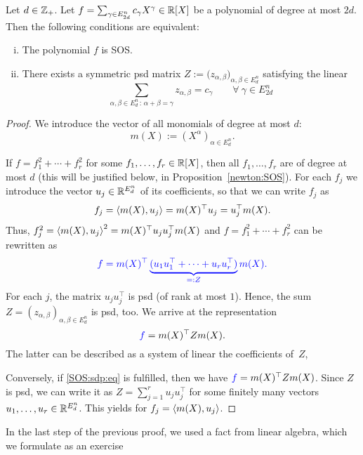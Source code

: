 \begin{proposition}
	\label{sos:as:sdp:feasibility}
	Let $d \in \mathbb{Z}_+$. Let $f = \sum_{ \gamma \in E_{2d}^n} c_\gamma X^\gamma \in \mathbb{R}[X]$ be a polynomial of degree at most $2d$. Then the following conditions are equivalent:
	\begin{enumerate}[(i)]
		\item The polynomial $f$ is SOS. 
		\item There exists a symmetric psd matrix $Z:= \bigl(z_{\alpha,\beta})_{\alpha,\beta \in E_d^n}$ satisfying the linear   
		\begin{equation}
			\sum_{\alpha, \beta \in E_d^n \, : \, \alpha + \beta = \gamma} z_{\alpha, \beta} = c_\gamma \qquad \forall \ \gamma \in E_{2 d}^n \label{SOS:sdp:eq}
		\end{equation}
	\end{enumerate}
\end{proposition}
\begin{proof}
	We introduce the vector of all monomials of degree at most $d$: 
	\[
		m(X):=(X^\alpha)_{\alpha \in E_d^n}.
	\]
	
	If $f = f_1^2 + \cdots + f_r^2$ for some $f_1,\ldots,f_r \in \mathbb{R}[X]$, then all $f_1,\ldots,f_r$ are of degree at most $d$ (this will be justified below, in Proposition~\ref{newton:SOS}). For each $f_j$ we introduce the vector $u_j \in \mathbb{R}^{E_d^n}$ of its coefficients, so that we can write $f_j$ as 
	\[
		f_j = \left\langle m(X) , u_j \right\rangle = m(X)^\top u_j = u_j^\top m(X).
	\]
	Thus, $f_j^2 = \left\langle m(X) , u_j \right\rangle^2 = m(X)^\top u_j u_j^\top m(X)$ and $f=f_1^2 + \cdots + f_r^2$ can be rewritten as 
	\[ 
		\textcolor{blue}{f = m(X)^\top \underbrace{(u_1 u_1^\top + \cdots + u_r u_r^\top )}_{=:Z} m(X).}
	\]
	For each $j$, the matrix $u_j u_j^\top$ is psd (of rank at most $1$). Hence, the sum $Z = (z_{\alpha,\beta})_{\alpha,\beta \in E_d^n}$ is psd, too. We arrive at the representation 
	\[
		\textcolor{blue}{f} = m(X)^\top Z m(X).
	\]
	The latter can be described as a system of linear   the coefficients of~$Z$,  
	
	Conversely, if \eqref{SOS:sdp:eq} is fulfilled, then we have $\textcolor{blue}{f}= m(X)^\top Z m(X)$. Since $Z$ is psd, we can write it as $Z = \sum_{j=1}^r u_j u_j^\top$ for some finitely many vectors $u_1,\ldots,u_r \in \mathbb{R}^{E_d^n}$. This yields  for $f_j = \left\langle m(X) , u_j \right\rangle$. 
\end{proof}

In the last step of the previous proof, we used a fact from linear algebra, which we formulate as an exercise

